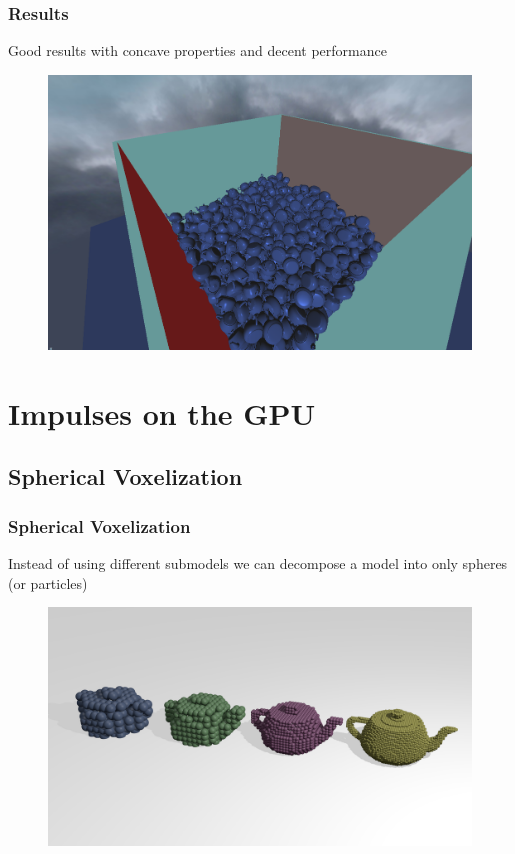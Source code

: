 \documentclass{beamer}
\begin{document}
	\begin{frame}
		\frametitle{Results}
		Good results with concave properties and decent performance
		\begin{figure}
			\includegraphics[width=0.7\linewidth]{fig/HACD512-05-11.png}
		\end{figure}
	\end{frame}

	\section{Impulses on the GPU}
	\subsection{Spherical Voxelization}
	\begin{frame}
		\frametitle{Spherical Voxelization}
		Instead of using different submodels we can decompose a model into only spheres (or particles)
		\begin{figure}
			\includegraphics[width=0.8\linewidth]{fig/voxelExample.png}
		\end{figure}
	\end{frame}
\end{document}
